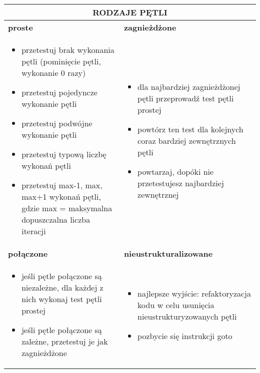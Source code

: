 \documentclass[../main.tex]{subfiles}
\begin{document}
    \begin{table}[H]
        \begin{center}
            \begin{tabular}{| p{8cm} | p{8cm} |}
                \hline
                \multicolumn{2}{|c|}{\textbf{RODZAJE PĘTLI}} \\
                \hline
                \hline
                \textbf{proste}    & \textbf{zagnieżdżone}          \\
                \hline
                \begin{itemize}
                    \item przetestuj brak wykonania pętli (pominięcie pętli, wykonanie 0 razy)
                    \item przetestuj pojedyncze wykonanie pętli
                    \item przetestuj podwójne wykonanie pętli
                    \item przetestuj typową liczbę wykonań pętli
                    \item przetestuj max-1, max, max+1 wykonań pętli, gdzie max =
                    maksymalna dopuszczalna liczba iteracji
                \end{itemize}
                &
                \begin{itemize}
                    \item dla najbardziej zagnieżdżonej pętli przeprowadź test pętli prostej
                    \item powtórz ten test dla kolejnych coraz bardziej zewnętrznych pętli
                    \item powtarzaj, dopóki nie przetestujesz najbardziej zewnętrznej
                \end{itemize} \\
                \hline
                \hline
                \textbf{połączone} & \textbf{nieustrukturalizowane} \\
                \hline
                \begin{itemize}
                    \item jeśli pętle połączone są niezależne, dla każdej z nich wykonaj test pętli prostej
                    \item jeśli pętle połączone są zależne, przetestuj je jak zagnieżdżone
                \end{itemize}
                &
                \begin{itemize}
                    \item najlepsze wyjście: refaktoryzacja
                    kodu w celu usunięcia
                    nieustrukturyzowanych pętli
                    \item pozbycie się instrukcji goto
                \end{itemize} \\
                \hline
            \end{tabular}
        \end{center}
    \end{table}
\end{document}
